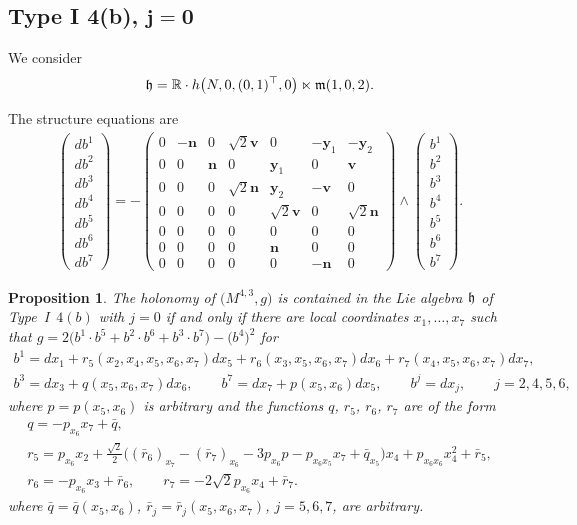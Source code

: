 \documentclass[11pt]{article}
\numberwithin{equation}{section}
\newtheorem{Proposition}[Theorem]{Proposition}
 { \theoremstyle{definition}
\newtheorem{Definition}[Theorem]{Definition}
\newtheorem{Example}[Theorem]{Example}
\newtheorem{Remark}[Theorem]{Remark} }
\newcommand\fh{{\frak h}}
\newcommand\fm{{\frak m}}
\newcommand\by{{\mathbf y}}
\newcommand\bn{{\mathbf n}}
\newcommand\bv{{\mathbf v}}
\newcommand\RR{{\mathbb R}}
\begin{document}
\subsection[Type I 4(b), $j=0$]{Type I 4(b), $\boldsymbol{j=0}$}
We consider
\begin{gather*}\fh=\RR\cdot h\big(N,0,(0,1)^\top,0\big) \ltimes\fm(1,0,2).\end{gather*}

The structure equations are
\begin{gather}\label{EI4(b)}\left(\begin{matrix} db^1\\db^2\\db^3\\db^4\\db^5\\db^6\\db^7\end{matrix}\right) = -\left(
\begin{matrix}
0 &-\bn&0&\sqrt 2 \bv&0&-\by_1&-\by_2\\
0&0&\bn&0&\by_1&0&\bv\\
0&0&0&\sqrt 2 \bn&\by_2&-\bv&0\\
0&0&0&0&\sqrt 2 \bv&0&\sqrt 2 \bn\\
0&0&0&0&0&0&0\\
0&0&0&0&\bn&0&0\\
0&0&0&0&0&-\bn&0
\end{matrix}\right) \wedge \left(\begin{matrix} b^1\\b^2\\b^3\\b^4\\b^5\\b^6\\b^7\end{matrix}\right).
\end{gather}

\begin{Proposition} The holonomy of $\big(M^{4,3},g\big)$ is contained in the Lie algebra $\fh$ of Type~I~$4(b)$ with $j=0$ if and only if there are local coordinates $x_1,\dots,x_7$ such that $g=2\big(b^1\cdot b^5+b^2\cdot b^6+b^3\cdot b^7\big)- \big(b^4\big)^2$ for
\begin{gather*}
b^1=dx_1 + r_5(x_2,x_4,x_5,x_6, x_7)dx_5+r_6(x_3,x_5,x_6,x_7)dx_6+r_7(x_4,x_5,x_6,x_7)dx_7, \\
b^3= dx_3+q(x_5,x_6,x_7) dx_6, \qquad
b^7= dx_7 +p(x_5,x_6)dx_5,\qquad
b^j= dx_j, \qquad j=2,4,5,6,
\end{gather*}
where
$p=p(x_5,x_6)$ is arbitrary and the functions $q$, $r_5$, $r_6$, $r_7$ are of the form
\begin{gather*}
q=-p_{x_6}x_7+\bar q, \\
r_5=p_{x_6}x_2+ \tfrac{\sqrt2}2 \big( (\bar r_6)_{x_7}-(\bar r_7)_{x_6}-3p_{x_6}p-p_{x_6x_5}x_7+\bar q_{x_5}\big)x_4+p_{x_6 x_6}x_4^2+\bar r_5,\\
r_6=-p_{x_6}x_3+\bar r_6, \qquad
r_7=-2\sqrt2 p_{x_6}x_4+\bar r_7.
\end{gather*}
where
$\bar q=\bar q(x_5,x_6)$, $\bar r_j =\bar r_j (x_5,x_6,x_7)$, $j=5,6,7$, are arbitrary.
\end{Proposition}
\end{document}
